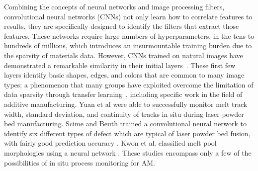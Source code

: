 Combining the concepts of neural networks and image processing filters, convolutional neural networks (CNNs) not only learn how to correlate features to results, they are specifically designed to identify the filters that extract those features. These networks require large numbers of hyperparameters, in the tens to hundreds of millions, which introduces an insurmountable training burden due to the sparsity of materials data. However, CNNs trained on natural images have demonstrated a remarkable similarity in their initial layers~\cite{Yosinski2014}. These first few layers identify basic shapes, edges, and colors that are common to many image types; a phenomenon that many groups have exploited overcome the limitation of data sparsity through transfer learning~\cite{Ling2017a}, including specific work in the field of additive manufacturing. Yuan et al \cite{Yuan2018} were able to successfully monitor melt track width, standard deviation, and continuity of tracks in situ during laser powder bed manufacturing. Scime and Beuth trained a convolutional neural network to identify six different types of defect which are typical of laser powder bed fusion, with fairly good prediction accuracy \cite{Scime2018}. Kwon et al. classified melt pool morphologies using a neural network \cite{Kwon2018}. These studies encompass only a few of the possibilities of in situ process monitoring for AM. 



